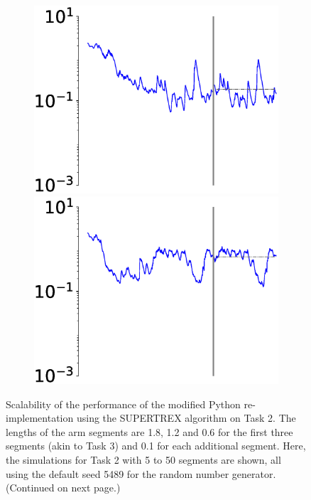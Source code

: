 \begin{figure}
\begin{subfigure}{\textwidth}
            \hspace{-1em}
            \includegraphics[height=0.15\linewidth,width=.45\linewidth]{Figures/Fig_T6/ImprovP/ST_T2_Seg9_Var_MSE.eps}
            \hspace{0em}
            \includegraphics[height=0.15\linewidth,width=.45\linewidth]{Figures/Fig_T6/ImprovP/ST_T2_Seg10_Var_MSE.eps}
            
        \end{subfigure}
    \caption{Scalability of the performance of the modified Python re-implementation using the SUPERTREX algorithm on Task 2. The lengths of the arm segments are 1.8, 1.2 and 0.6 for the first three segments (akin to Task 3) and 0.1 for each additional segment. Here, the simulations for Task 2 with 5 to 50 segments are shown, all using the default seed 5489 for the random number generator. (Continued on next page.)}
    \label{Fig:Scalability_Task2}

\end{figure}
    
    
    
